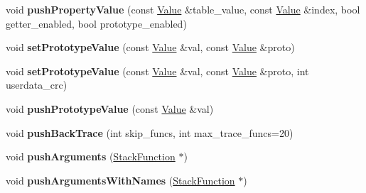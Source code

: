 \begin{DoxyCompactItemize}
\item 
void {\bfseries push\+Property\+Value} (const \hyperlink{struct_object_script_1_1_o_s_1_1_core_1_1_value}{Value} \&table\+\_\+value, const \hyperlink{struct_object_script_1_1_o_s_1_1_core_1_1_value}{Value} \&index, bool getter\+\_\+enabled, bool prototype\+\_\+enabled)\hypertarget{class_object_script_1_1_o_s_1_1_core_ac37ec8d509097d0f8d7ebebfb2395f0f}{}\label{class_object_script_1_1_o_s_1_1_core_ac37ec8d509097d0f8d7ebebfb2395f0f}

\item 
void {\bfseries set\+Prototype\+Value} (const \hyperlink{struct_object_script_1_1_o_s_1_1_core_1_1_value}{Value} \&val, const \hyperlink{struct_object_script_1_1_o_s_1_1_core_1_1_value}{Value} \&proto)\hypertarget{class_object_script_1_1_o_s_1_1_core_afe1a7919b5e829d79d6fbf3f356ed961}{}\label{class_object_script_1_1_o_s_1_1_core_afe1a7919b5e829d79d6fbf3f356ed961}

\item 
void {\bfseries set\+Prototype\+Value} (const \hyperlink{struct_object_script_1_1_o_s_1_1_core_1_1_value}{Value} \&val, const \hyperlink{struct_object_script_1_1_o_s_1_1_core_1_1_value}{Value} \&proto, int userdata\+\_\+crc)\hypertarget{class_object_script_1_1_o_s_1_1_core_ae8275094e3c7f5fb9f8e0fc0ca2210f3}{}\label{class_object_script_1_1_o_s_1_1_core_ae8275094e3c7f5fb9f8e0fc0ca2210f3}

\item 
void {\bfseries push\+Prototype\+Value} (const \hyperlink{struct_object_script_1_1_o_s_1_1_core_1_1_value}{Value} \&val)\hypertarget{class_object_script_1_1_o_s_1_1_core_a6dfd9ef7453ea8b0fb5ad56eb8412ac8}{}\label{class_object_script_1_1_o_s_1_1_core_a6dfd9ef7453ea8b0fb5ad56eb8412ac8}

\item 
void {\bfseries push\+Back\+Trace} (int skip\+\_\+funcs, int max\+\_\+trace\+\_\+funcs=20)\hypertarget{class_object_script_1_1_o_s_1_1_core_ab67e04f8253f718f5968e306092caa0b}{}\label{class_object_script_1_1_o_s_1_1_core_ab67e04f8253f718f5968e306092caa0b}

\item 
void {\bfseries push\+Arguments} (\hyperlink{struct_object_script_1_1_o_s_1_1_core_1_1_stack_function}{Stack\+Function} $\ast$)\hypertarget{class_object_script_1_1_o_s_1_1_core_ab28e7477e4ae96838b90cb25c406faa8}{}\label{class_object_script_1_1_o_s_1_1_core_ab28e7477e4ae96838b90cb25c406faa8}

\item 
void {\bfseries push\+Arguments\+With\+Names} (\hyperlink{struct_object_script_1_1_o_s_1_1_core_1_1_stack_function}{Stack\+Function} $\ast$)\hypertarget{class_object_script_1_1_o_s_1_1_core_a9fc09c38856760bbb465771c46524630}{}\label{class_object_script_1_1_o_s_1_1_core_a9fc09c38856760bbb465771c46524630}


\end{DoxyCompactItemize}
